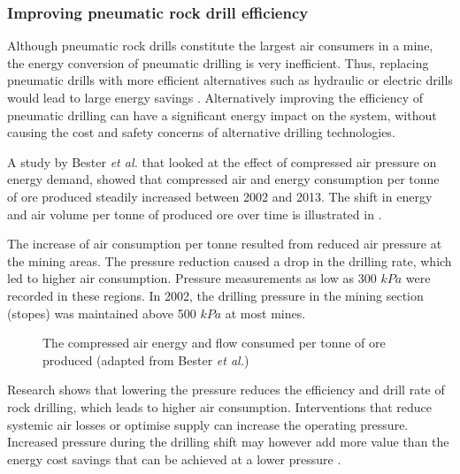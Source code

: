 		\subsubsection{Improving pneumatic rock drill efficiency}
		 Although pneumatic rock drills constitute the largest air consumers in a mine, the energy conversion of pneumatic drilling is very inefficient. Thus, replacing pneumatic drills with more efficient alternatives such as hydraulic or electric drills would lead to large energy savings \cite{Pascoe2016Masters}. Alternatively improving the efficiency of pneumatic drilling can have a significant energy impact on the system, without causing the cost and safety concerns of alternative drilling technologies.
		 \par 
		 A study by Bester \textit{et al.} \cite{bester2013effect} that looked at the effect of compressed air pressure on energy demand, showed that compressed air and energy consumption per tonne of ore produced steadily increased between 2002 and 2013. The shift in energy and air volume per tonne of produced ore over time is illustrated in . 
		 \par
		 The increase of air consumption per tonne resulted from reduced air pressure at the mining areas. The pressure reduction caused a drop in the drilling rate, which led to higher air consumption. Pressure measurements as low as 300 $kPa$ were recorded in these regions. In 2002, the drilling pressure in the mining section (stopes) was maintained above 500 $kPa$ at most mines\footnotemark[1]. 
		 \par 
		 \begin{figure}[!htbp]
		 	\centering
		 	
		 	\caption[The compressed air energy and flow consumed per tonne of ore produced]{The compressed air energy and flow consumed per tonne of ore produced (adapted from Bester \textit{et al.}\cite{bester2013effect})}
		 	\label{fig: Compressed energy and deep level per ton}
		 \end{figure}
	 \clearpage
		 Research shows that lowering the pressure reduces the efficiency and drill rate of rock drilling, which leads to higher air consumption. Interventions that reduce systemic air losses or optimise supply can increase the operating pressure. Increased pressure during the drilling shift may however add more value than the energy cost savings that can be achieved at a lower pressure \cite{bester2013effect}.
